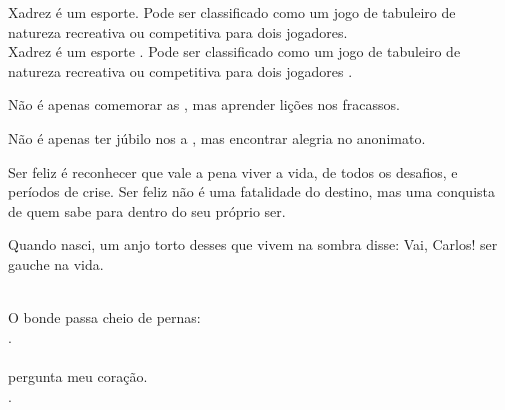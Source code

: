 \documentclass[12pt,a4paper,brazil]{article}
\begin{document}
Xadrez é um esporte. Pode ser classificado como um jogo de tabuleiro de natureza recreativa ou competitiva para dois jogadores.\\

Xadrez é um esporte . Pode ser classificado como um jogo de tabuleiro de natureza recreativa ou competitiva para dois jogadores .



Não é apenas comemorar as , mas aprender lições nos fracassos.

Não é apenas ter júbilo nos a , mas encontrar alegria no anonimato.

Ser feliz é reconhecer que vale a pena viver a vida,  de todos os desafios,  e períodos de crise. Ser feliz não é uma fatalidade do destino, mas uma conquista de quem sabe  para dentro do seu próprio ser.\\

\newpage


Quando nasci, um anjo torto
desses que vivem na sombra
disse: Vai, Carlos! ser gauche na vida.


\\





\newpage 
\noindent O bonde passa cheio de pernas:\\
.\\
\\
pergunta meu coração.\\
\noindent {}.
\end{document}
